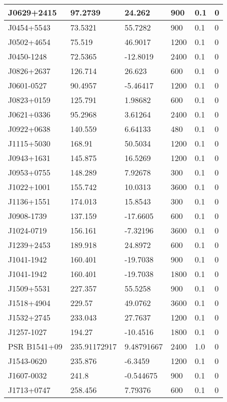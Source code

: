 \begin{table}
\begin{tabular}{|l|l|l|l|l|l|}
J0629+2415 & 97.2739 & 24.262 & 900 & 0.1 & 0 \\ \hline
J0454+5543 & 73.5321 & 55.7282 & 900 & 0.1 & 0 \\ \hline
J0502+4654 & 75.519 & 46.9017 & 1200 & 0.1 & 0 \\ \hline
J0450-1248 & 72.5365 & -12.8019 & 2400 & 0.1 & 0 \\ \hline
J0826+2637 & 126.714 & 26.623 & 600 & 0.1 & 0 \\ \hline
J0601-0527 & 90.4957 & -5.46417 & 1200 & 0.1 & 0 \\ \hline
J0823+0159 & 125.791 & 1.98682 & 600 & 0.1 & 0 \\ \hline
J0621+0336 & 95.2968 & 3.61264 & 2400 & 0.1 & 0 \\ \hline
J0922+0638 & 140.559 & 6.64133 & 480 & 0.1 & 0 \\ \hline
J1115+5030 & 168.91 & 50.5034 & 1200 & 0.1 & 0 \\ \hline
J0943+1631 & 145.875 & 16.5269 & 1200 & 0.1 & 0 \\ \hline
J0953+0755 & 148.289 & 7.92678 & 300 & 0.1 & 0 \\ \hline
J1022+1001 & 155.742 & 10.0313 & 3600 & 0.1 & 0 \\ \hline
J1136+1551 & 174.013 & 15.8543 & 300 & 0.1 & 0 \\ \hline
J0908-1739 & 137.159 & -17.6605 & 600 & 0.1 & 0 \\ \hline
J1024-0719 & 156.161 & -7.32196 & 3600 & 0.1 & 0 \\ \hline
J1239+2453 & 189.918 & 24.8972 & 600 & 0.1 & 0 \\ \hline
J1041-1942 & 160.401 & -19.7038 & 900 & 0.1 & 0 \\ \hline
J1041-1942 & 160.401 & -19.7038 & 1800 & 0.1 & 0 \\ \hline
J1509+5531 & 227.357 & 55.5258 & 900 & 0.1 & 0 \\ \hline
J1518+4904 & 229.57 & 49.0762 & 3600 & 0.1 & 0 \\ \hline
J1532+2745 & 233.043 & 27.7637 & 1200 & 0.1 & 0 \\ \hline
J1257-1027 & 194.27 & -10.4516 & 1800 & 0.1 & 0 \\ \hline
PSR B1541+09 & 235.91172917 & 9.48791667 & 2400 & 1.0 & 0 \\ \hline
J1543-0620 & 235.876 & -6.3459 & 1200 & 0.1 & 0 \\ \hline
J1607-0032 & 241.8 & -0.544675 & 900 & 0.1 & 0 \\ \hline
J1713+0747 & 258.456 & 7.79376 & 600 & 0.1 & 0 \\ \hline

\end{tabular}
\end{table}
